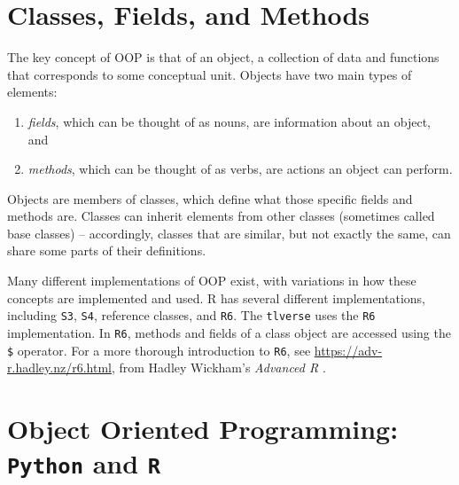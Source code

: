 \documentclass[
  12pt, krantz2,
]{book}
\newcommand{\passthrough}[1]{#1}
\providecommand{\tightlist}{%
  \setlength{\itemsep}{0pt}\setlength{\parskip}{0pt}}
\theoremstyle{definition}
\theoremstyle{definition}
\theoremstyle{definition}
\newcommand{\1}{\mathbbm{1}}
\begin{document}
\hypertarget{classes-fields-and-methods}{%
\section{Classes, Fields, and Methods}\label{classes-fields-and-methods}}

The key concept of OOP is that of an object, a collection of data and functions
that corresponds to some conceptual unit. Objects have two main types of
elements:

\begin{enumerate}
\def\labelenumi{\arabic{enumi}.}
\tightlist
\item
  \emph{fields}, which can be thought of as nouns, are information about an object,
  and
\item
  \emph{methods}, which can be thought of as verbs, are actions an object can
  perform.
\end{enumerate}

Objects are members of classes, which define what those specific fields and
methods are. Classes can inherit elements from other classes (sometimes called
base classes) -- accordingly, classes that are similar, but not exactly the
same, can share some parts of their definitions.

Many different implementations of OOP exist, with variations in how these
concepts are implemented and used. R has several different implementations,
including \passthrough{\lstinline!S3!}, \passthrough{\lstinline!S4!}, reference classes, and \passthrough{\lstinline!R6!}. The \passthrough{\lstinline!tlverse!} uses the \passthrough{\lstinline!R6!}
implementation. In \passthrough{\lstinline!R6!}, methods and fields of a class object are accessed using
the \passthrough{\lstinline!$!} operator. For a more thorough introduction to \passthrough{\lstinline!R6!}, see \url{https://adv-r.hadley.nz/r6.html}, from Hadley Wickham's \emph{Advanced
R} \citep{wickham2014advanced}.

\hypertarget{object-oriented-programming-python-and-r}{%
\section{\texorpdfstring{Object Oriented Programming: \texttt{Python} and \texttt{R}}{Object Oriented Programming: Python and R}}\label{object-oriented-programming-python-and-r}}
\end{document}
